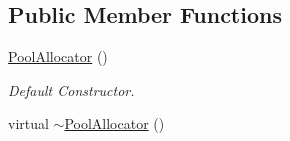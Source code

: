 \subsection*{Public Member Functions}
\begin{DoxyCompactItemize}
\item 
\hyperlink{classDE_1_1PoolAllocator_a337eec96091914fcb256b5aa0c88e057}{Pool\+Allocator} ()\hypertarget{classDE_1_1PoolAllocator_a337eec96091914fcb256b5aa0c88e057}{}\label{classDE_1_1PoolAllocator_a337eec96091914fcb256b5aa0c88e057}

\begin{DoxyCompactList}\small\item\em Default Constructor. \end{DoxyCompactList}\item 
virtual \hyperlink{classDE_1_1PoolAllocator_aa43fb65878a2843367907c0c7f87f601}{$\sim$\+Pool\+Allocator} ()\hypertarget{classDE_1_1PoolAllocator_aa43fb65878a2843367907c0c7f87f601}{}\label{classDE_1_1PoolAllocator_aa43fb65878a2843367907c0c7f87f601}


\end{DoxyCompactItemize}
